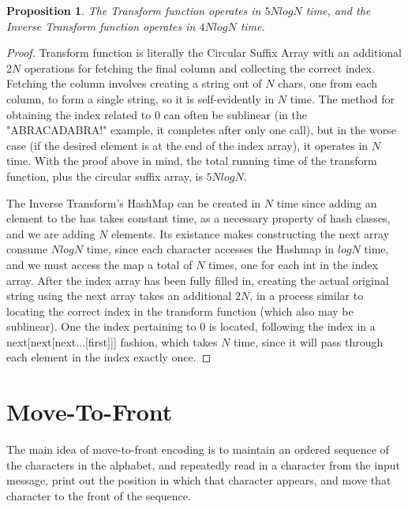 \documentclass[12pt]{article}
\newtheorem{proposition}[theorem]{Proposition}
\begin{document}
\begin{proposition}
\label{numq}
The Transform function operates in $5NlogN$ time, and the Inverse Transform function operates in $4NlogN$ time.
\end{proposition}

\begin{proof}
Transform function is literally the Circular Suffix Array with an additional 2$N$ operations for fetching the final column and collecting the correct index. Fetching the column involves creating a string out of $N$ chars, one from each column, to form a single string, so it is self-evidently in $N$ time. The method for obtaining the index related to 0 can often be sublinear (in the "ABRACADABRA!" example, it completes after only one call), but in the worse case (if the desired element is at the end of the index array), it operates in $N$ time. With the proof above in mind, the total running time of the transform function, plus the circular suffix array, is $5NlogN$.

The Inverse Transform's HashMap can be created in $N$ time since adding an element to the has takes constant time, as a necessary property of hash classes, and we are adding $N$ elements. Its existance makes constructing the next array consume $NlogN$ time, since each character accesses the Hashmap in $logN$ time, and we must access the map a total of $N$ times, one for each int in the index array. After the index array has been fully filled in, creating the actual original string using the next array takes an additional $2N$, in a process similar to locating the correct index in the transform function (which also may be sublinear). One the index pertaining to 0 is located, following the index in a next[next[next...[first]]] fashion, which takes $N$ time, since it will pass through each element in the index exactly once.
\end{proof}



\section{Move-To-Front}
 The main idea of move-to-front encoding is to maintain an ordered sequence of the characters in the alphabet, and repeatedly read in a character from the input message, print out the position in which that character appears, and move that character to the front of the sequence.
 
 

\end{document}
